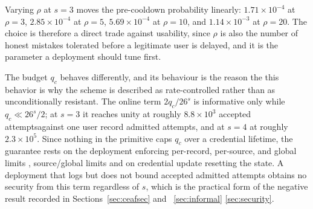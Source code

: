 \documentclass[cmc,article,submit,moreauthors,pdftex]{Definitions/tsp}
\providecommand{\DIFadd}[1]{{\protect\color{blue} \sf #1}} %
\providecommand{\DIFdel}[1]{{\protect\color{red} \scriptsize #1}} %
\providecommand{\DIFaddbegin}{} %
\providecommand{\DIFaddend}{} %
\providecommand{\DIFdelbegin}{} %
\providecommand{\DIFdelend}{} %
\providecommand{\DIFaddbeginFL}{} %
\providecommand{\DIFaddendFL}{} %
\providecommand{\DIFdelbeginFL}{} %
\providecommand{\DIFdelendFL}{} %
\begin{document}
\begin{table}[t]
\begin{tabularx}{\textwidth}{cccXccc>{\raggedright\arraybackslash}X}
\bottomrule
\end{tabularx}
\DIFdelbeginFL %
\DIFdelendFL \DIFaddbeginFL {}
\DIFaddendFL \end{table}

\DIFdelbegin \DIFdel{Varying $\rho$ at $s=3$ moves the pre-cooldown probability linearly: $1.71\times10^{-4}$ at $\rho=3$, $2.85\times10^{-4}$ at $\rho=5$, $5.69\times10^{-4}$ at $\rho=10$, and $1.14\times10^{-3}$ at $\rho=20$. The choice is therefore a direct trade against usability, since $\rho$ is also the number of honest mistakes tolerated before a legitimate user is delayed, and it is the parameter a deployment should tune first.
}%

\DIFdelend The budget $q_{c}$ behaves differently, and \DIFdelbegin \DIFdel{its behaviour is the reason the }\DIFdelend \DIFaddbegin \DIFadd{this behavior is why the }\DIFaddend scheme is described as rate-controlled rather than \DIFdelbegin \DIFdel{as }\DIFdelend unconditionally resistant. The online term $2q_{c}/26^{s}$ is informative only while $q_{c}\ll26^{s}/2$; at $s=3$ it reaches unity at roughly $8.8\times10^{3}$ \DIFdelbegin \DIFdel{accepted attemptsagainst one user record}\DIFdelend \DIFaddbegin \DIFadd{admitted attempts}\DIFaddend , and at $s=4$ at roughly $2.3\times10^{5}$. Since nothing in the primitive caps $q_{c}$ over a credential lifetime, the guarantee rests on the deployment enforcing \DIFdelbegin \DIFdel{per-record, per-source, and global limits , }\DIFdelend \DIFaddbegin \DIFadd{source/global limits }\DIFaddend and on credential update resetting the state. A deployment that logs but does not bound \DIFdelbegin \DIFdel{accepted }\DIFdelend \DIFaddbegin \DIFadd{admitted }\DIFaddend attempts obtains no security from this term regardless of $s$, which is the practical form of the negative result recorded in Sections~\ref{sec:ceafsec} and~\DIFdelbegin \DIFdel{\ref{sec:informal}}\DIFdelend \DIFaddbegin \DIFadd{\ref{sec:security}}\DIFaddend .
\end{document}
